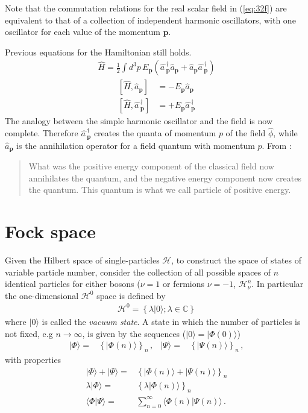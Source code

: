 Note that the commutation relations for the real scalar field in (\ref{eq:32f}) are equivalent to that of a collection of independent harmonic oscillators, with one oscillator for each value of the momentum $\mathbf{p}$.

Previous equations for the Hamiltonian still holds. 
\begin{align}
  \widehat{H}=\frac{1}{2}\int d^3p\,E_{\mathbf{p}}\left(\widehat{a\,}_{\mathbf{p}}^\dagger\widehat{a}_{\mathbf{p}}
+\widehat{a}_{\mathbf{p}}\widehat{a\,}_{\mathbf{p}}^\dagger\right)
\end{align}
\begin{align}
  \left[\widehat{H},\widehat{a}_{\mathbf{p}}\right]&=-E_{\mathbf{p}}\widehat{a}_{\mathbf{p}}\nonumber\\
  \left[\widehat{H},\widehat{a\,}_{\mathbf{p}}^\dagger \right]&=+E_{\mathbf{p}}\widehat{a\,}_{\mathbf{p}}^\dagger
\end{align}
The analogy between the simple harmonic oscillator and the field is now complete. Therefore $\widehat{a\,}_{\mathbf{p}}^\dagger$ creates the quanta of momentum $p$ of the field $\widehat{\phi}$, while $\widehat{a}_{\mathbf{p}}$ is the annihilation operator for a field quantum with momentum $p$. From \cite{Lahiri:2005sm}:
\begin{quote}
  What was the positive energy component of the classical field now annihilates the quantum, and the negative energy component now creates the quantum. This quantum is what we call particle of positive energy.
\end{quote}


\section{Fock space}

Given the Hilbert space of single-particles $\mathcal{H}$, to construct the space of states of variable particle number, consider the collection of all possible spaces of $n$ identical particles for either bosons ($\nu=1$ or fermions $\nu=-1$, $\mathcal{H}^n_{\nu}$. In particular the one-dimensional $\mathcal{H}^0$ space is defined by
\begin{align}
  \mathcal{H}^0=\left\{ \lambda|0\rangle;\lambda\in \mathbb{C} \right\}
\end{align}
where   $|0\rangle$ is called the \emph{vacuum state}.
A state in which the number of particles is not fixed, e.g $n\to\infty$, is given by the sequences ($|0\rangle=|\Phi(0)\rangle$)
\begin{align}
\label{eq:fffs}
  |\Phi\rangle=&\left\{ |\Phi(n)\rangle \right\}_n\,,&  |\Psi\rangle=&\left\{ |\Psi(n)\rangle \right\}_n\,,
\end{align}
with properties
\begin{align}
  |\Phi\rangle+|\Psi\rangle=&\left\{ |\Phi(n)\rangle+|\Psi(n)\rangle \right\}_n \nonumber\\
\lambda  |\Phi\rangle=& \left\{\lambda |\Phi(n)\rangle \right\}_n \nonumber\\
\langle\Phi|\Psi\rangle=&\sum_{n=0}^{\infty}\langle\Phi(n)|\Psi(n)\rangle\,.
\end{align}

